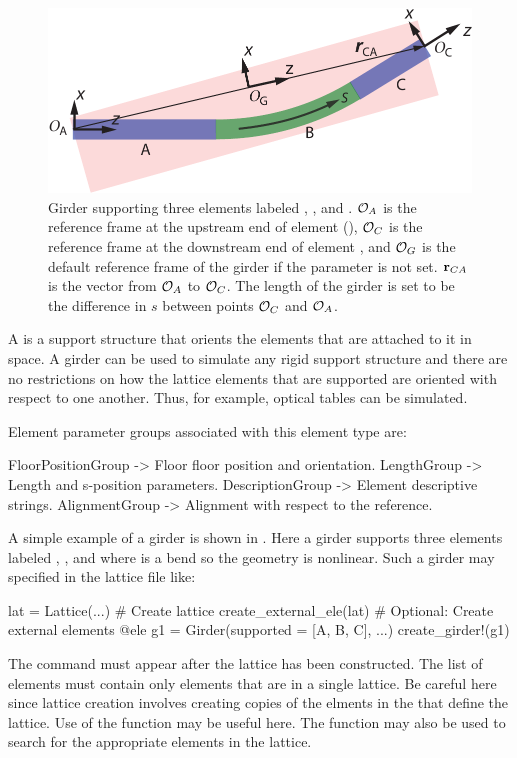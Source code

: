 \begin{figure}[t]
  \centering
  \includegraphics{girder.pdf}
  \caption[Girder example.] {
Girder supporting three elements labeled , , and .  ${\cal O}_A$ is the reference
frame at the upstream end of element  (), ${\cal O}_C$ is the reference
frame at the downstream end of element , and ${\cal O}_G$ is the default  reference
frame of the girder if the  parameter is not set. ${\bf r}_{CA}$ is the vector from
${\cal O}_A$ to ${\cal O}_C$. The length  of the girder is set to be the difference in $s$ between
points ${\cal O}_C$ and ${\cal O}_A$.
  }
  \label{f:girder}
\end{figure}

A  is a support structure that orients the elements that are attached to it in space. A
girder can be used to simulate any rigid support structure and there are no restrictions on how the
lattice elements that are supported are oriented with respect to one another.  Thus, for example,
optical tables can be simulated.

Element parameter groups associated with this element type are:
\TOPrule
\begin{example}
  FloorPositionGroup -> Floor floor position and orientation.  
  LengthGroup        -> Length and s-position parameters.  
  DescriptionGroup   -> Element descriptive strings.  
  AlignmentGroup     -> Alignment with respect to the reference. 
\end{example}
\BOTTOMrule

A simple example of a girder is shown in . Here a girder supports three
elements labeled , , and  where  is a bend so the geometry is
nonlinear. Such a girder may specified in the lattice file like:
\begin{example}
  lat = Lattice(...)        # Create lattice
  create_external_ele(lat)  # Optional: Create external elements 
  @ele g1 = Girder(supported = [A, B, C], ...)
  create_girder!(g1)
\end{example}
The  command must appear after the lattice has been constructed.
The list of  elements must contain only elements that are in a single
lattice. Be careful here since lattice creation involves creating copies of the elments
in the  that define the lattice. Use of the function 
may be useful here. The  function may also be used to search for the appropriate
elements in the lattice. 


